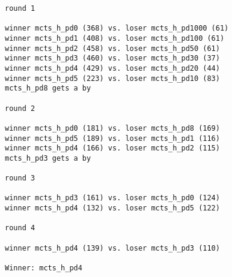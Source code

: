 \documentclass{article}
\begin{document}
\begin{verbatim}
round 1

winner mcts_h_pd0 (368) vs. loser mcts_h_pd1000 (61)
winner mcts_h_pd1 (408) vs. loser mcts_h_pd100 (61)
winner mcts_h_pd2 (458) vs. loser mcts_h_pd50 (61)
winner mcts_h_pd3 (460) vs. loser mcts_h_pd30 (37)
winner mcts_h_pd4 (429) vs. loser mcts_h_pd20 (44)
winner mcts_h_pd5 (223) vs. loser mcts_h_pd10 (83)
mcts_h_pd8 gets a by

round 2

winner mcts_h_pd0 (181) vs. loser mcts_h_pd8 (169)
winner mcts_h_pd5 (189) vs. loser mcts_h_pd1 (116)
winner mcts_h_pd4 (166) vs. loser mcts_h_pd2 (115)
mcts_h_pd3 gets a by

round 3

winner mcts_h_pd3 (161) vs. loser mcts_h_pd0 (124)
winner mcts_h_pd4 (132) vs. loser mcts_h_pd5 (122)

round 4

winner mcts_h_pd4 (139) vs. loser mcts_h_pd3 (110)

Winner: mcts_h_pd4
\end{verbatim}
\end{document}
